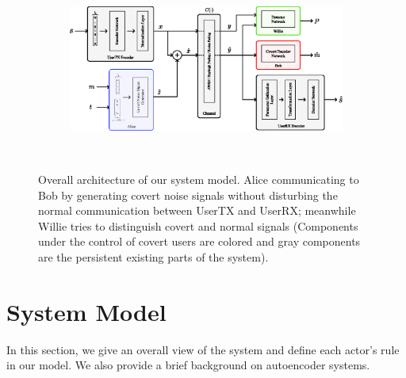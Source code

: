 \begin{figure}[thp]
	\center
	\begin{subfigure}{0.8\textwidth}
		\includegraphics[width=\linewidth]{figs/system_architecture}
	\end{subfigure}
	\\
	\caption{Overall architecture of our system model. Alice communicating to Bob by generating covert noise signals without disturbing the normal communication between UserTX and UserRX; meanwhile Willie tries to distinguish covert and normal signals (Components under the control of covert users are colored and gray components are the persistent existing parts of the system).}	
	\label{fig:system_architecture}
\end{figure}


\section{System Model}
\label{s:model}
In this section, we give an overall view of the system and define each actor's rule in our model. We also provide a brief background on autoencoder systems.


